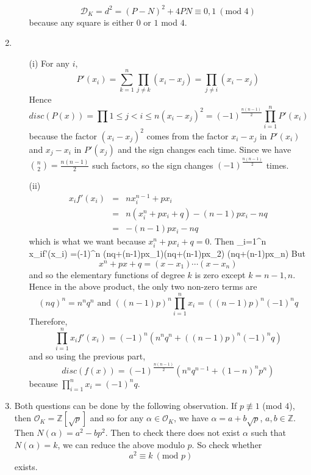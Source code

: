 \begin{enumerate}
\begin{enumerate}
    $$\mathcal{D}_K=d^2=(P-N)^2+4PN \equiv 0,1~(\text{mod } 4)$$
    because any square is either $0$ or $1$ mod $4$.
    \end{enumerate}
\item \begin{enumerate}
    \item[(i)] For any $i$,
    $$P'(x_i)=\sum_{k=1}^n \prod_{j \neq k}(x_i-x_j)=\prod_{j \neq i}(x_i-x_j)$$
    Hence
    $$disc(P(x))=\prod{1 \le j <i \le n}(x_i-x_j)^2 = (-1)^{\frac{n(n-1)}{2}}\prod_{i=1}^n P'(x_i)$$
    because the factor $(x_i-x_j)^2$ comes from the factor $x_i-x_j$ in $P'(x_i)$ and $x_j-x_i$ in $P'(x_j)$ and
    the sign changes each time. Since we have $\binom{n}{2}=\frac{n(n-1)}{2}$ such factors, so the sign changes
    $(-1)^{\frac{n(n-1)}{2}}$ times.\\
    \item[(ii)]
    \begin{eqnarray*}
    x_if'(x_i)&=&nx^{n-1}_i+px_i\\
    &=&n(x^n_i+px_i+q)-(n-1)px_i-nq\\
    &=&-(n-1)px_i-nq
    \end{eqnarray*}
    which is what we want because $x^n_i+px_i+q=0$.
    Then
    \be
    \prod_{i=1}^n x_if'(x_i) =(-1)^n (nq+(n-1)px_1)(nq+(n-1)px_2) \cdots(nq+(n-1)px_n)
    \ee
    But
    $$x^n+px+q=(x-x_1)\cdots(x-x_n)$$
    and so the elementary functions of degree $k$ is zero except $k=n-1,n$.
    Hence in the above product, the only two non-zero terms are
    $$(nq)^n=n^n q^n \text{ and } ((n-1)p)^n \prod_{i=1}^n x_i=((n-1)p)^n(-1)^nq$$
    Therefore,
   $$\prod_{i=1}^n x_if'(x_i)=(-1)^n (n^nq^n+((n-1)p)^n (-1)^n q)$$
    and so using the previous part,
   $$disc(f(x))=(-1)^{\frac{n(n-1)}{2}} (n^n q^{n-1}+(1-n)^np^n)$$
   because $\prod_{i=1}^n x_i =(-1)^nq$.
    \end{enumerate}
\item Both questions can be done by the following observation.
    If $p \not \equiv 1$ (mod $4$), then $\mathcal{O}_K=\mathbb{Z}[\sqrt{p}]$ and so for any
    $\alpha \in \mathcal{O}_K$, we have $\alpha=a+b\sqrt{p}$, $a,b \in \mathbb{Z}$. Then
    $N(\alpha)=a^2-bp^2$. Then to check there does not exist $\alpha$ such that
    $N(\alpha)=k$, we can reduce the above modulo $p$. So check whether
    $$a^2 \equiv k~(\text{mod }p)$$ exists.


\end{enumerate}
